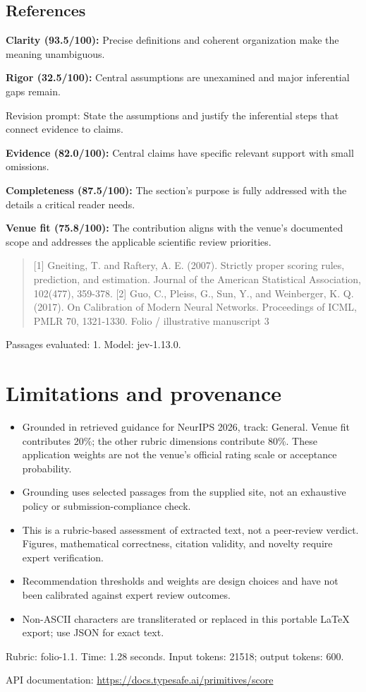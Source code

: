 \documentclass[11pt]{article}
\begin{document}
\subsection{References}
\par\textbf{Clarity (93.5/100):} Precise definitions and coherent organization make the meaning unambiguous.
\par\textbf{Rigor (32.5/100):} Central assumptions are unexamined and major inferential gaps remain.
\par Revision prompt: State the assumptions and justify the inferential steps that connect evidence to claims.
\par\textbf{Evidence (82.0/100):} Central claims have specific relevant support with small omissions.
\par\textbf{Completeness (87.5/100):} The section's purpose is fully addressed with the details a critical reader needs.
\par\textbf{Venue fit (75.8/100):} The contribution aligns with the venue's documented scope and addresses the applicable scientific review priorities.
\begin{quote}\small [1] Gneiting, T. and Raftery, A. E. (2007). Strictly proper scoring rules, prediction, and estimation. Journal
of the American Statistical Association, 102(477), 359-378.
[2] Guo, C., Pleiss, G., Sun, Y., and Weinberger, K. Q. (2017). On Calibration of Modern Neural
Networks. Proceedings of ICML, PMLR 70, 1321-1330.
Folio / illustrative manuscript                                      3\end{quote}
Passages evaluated: 1. Model: jev-1.13.0.
\section{Limitations and provenance}
\begin{itemize}
\item Grounded in retrieved guidance for NeurIPS 2026, track: General. Venue fit contributes 20\%; the other rubric dimensions contribute 80\%. These application weights are not the venue's official rating scale or acceptance probability.
\item Grounding uses selected passages from the supplied site, not an exhaustive policy or submission-compliance check.
\item This is a rubric-based assessment of extracted text, not a peer-review verdict. Figures, mathematical correctness, citation validity, and novelty require expert verification.
\item Recommendation thresholds and weights are design choices and have not been calibrated against expert review outcomes.
\item Non-ASCII characters are transliterated or replaced in this portable LaTeX export; use JSON for exact text.
\end{itemize}
Rubric: folio-1.1. Time: 1.28 seconds. Input tokens: 21518; output tokens: 600.
\par API documentation: \url{https://docs.typesafe.ai/primitives/score}
\end{document}
